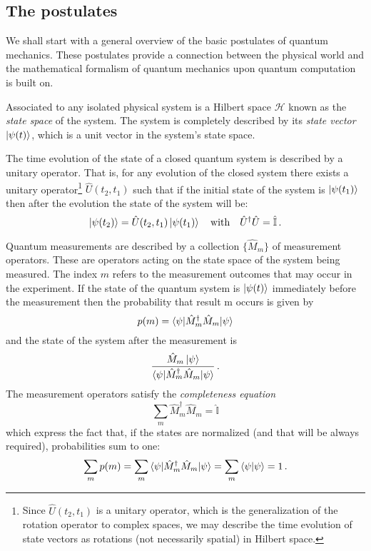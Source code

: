 \subsection{The postulates}
We shall start with a general overview of the basic postulates of quantum mechanics. These postulates provide a connection between the physical world and the mathematical formalism of quantum mechanics upon quantum computation is built on.
\begin{postulate}\label{postulate:1}
Associated to any isolated physical system is a Hilbert space $\mathcal{H}$ known as the \emph{state space} of the
system. The system is completely described by its \emph{state vector} $\ket{\psi(t)}$, which is a unit
vector in the system’s state space.
\end{postulate}
\begin{postulate}\label{postulate:2}
The time evolution of the state of a closed quantum system is described by a
unitary operator. That is, for any evolution of the closed system there exists
a unitary operator\footnote{Since $\widehat{U}(t_2,t_1)$ is a unitary operator, which is the generalization of the rotation operator to complex spaces, we may describe the time evolution of state vectors as rotations (not necessarily spatial) in Hilbert space.} $\widehat{U}(t_2,t_1)$ such that if the initial state of the system is $\ket{\psi(t_1)}$ then
after the evolution the state of the system will be:
\begin{equation*}
    \ket{\psi(t_2)} = \hat{U}(t_2,t_1) \ket{\psi(t_1)} \quad \text{with} \quad \hat{U}^\dagger\hat{U} = \hat{\mathbb{I}}\,.
\end{equation*}
\end{postulate}
\begin{postulate}\label{postulate:3}
Quantum measurements are described by a collection $\{\hat{M}_m\}$ of
measurement operators. These are operators acting on the state space of the
system being measured. The index $m$ refers to the measurement outcomes that
may occur in the experiment. If the state of the quantum system is $\ket{\psi(t)}$
immediately before the measurement then the probability that result m occurs is given by
\begin{equation*}
    p(m) = \braket{ \psi | \hat{M}^\dagger_m \hat{M}_m | \psi}
\end{equation*}
and the state of the system after the measurement is
\begin{equation*}
    \frac{\hat{M}_m\ket{\psi}}{\braket{\psi | \hat{M}^\dagger_m \hat{M}_m | \psi}}\,.
\end{equation*}
The measurement operators satisfy the \emph{completeness equation}
\begin{equation*}
    \sum_m \hat{M}_m^\dagger \hat{M}_m = \hat{\mathbb{I}}
\end{equation*}
which express the fact that, if the states are normalized (and that will be always required), probabilities sum to one: 
    \begin{equation}\label{eq:normalization}
    \sum_m p(m) = \sum_m \braket{ \psi | \hat{M}^\dagger_m \hat{M}_m | \psi} = \sum_m \braket{\psi | \psi} = 1\,.
    \end{equation}
\end{postulate} 
